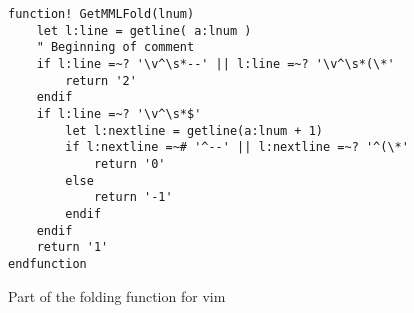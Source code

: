 \begin{figure}
    \begin{verbatim}
function! GetMMLFold(lnum) 
    let l:line = getline( a:lnum )
    " Beginning of comment
    if l:line =~? '\v^\s*--' || l:line =~? '\v^\s*(\*'
        return '2'
    endif
    if l:line =~? '\v^\s*$'
        let l:nextline = getline(a:lnum + 1)
        if l:nextline =~# '^--' || l:nextline =~? '^(\*'
            return '0'
        else
            return '-1'
        endif
    endif
    return '1'
endfunction 
    \end{verbatim}
    \caption{Part of the folding function for vim}
\label{fig:fold}
\end{figure}
